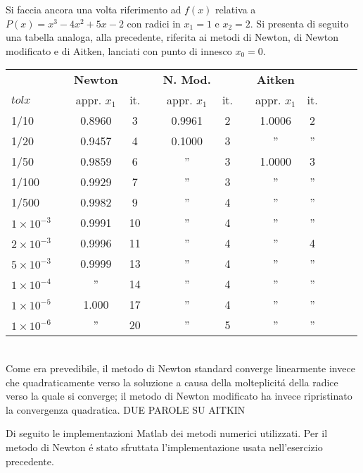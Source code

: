 Si faccia ancora una volta riferimento ad \(f(x)\) relativa a \(P(x)=x^3 - 4x^2 + 5x - 2\) con radici in \(x_1=1\) e \(x_2=2\). Si presenta di seguito una tabella analoga, alla precedente, riferita ai metodi di Newton, di Newton modificato e di Aitken, lanciati con punto di innesco \(x_0 = 0\).\\

\begin{tabular}{l*{12}{c}}
 & \vline& \textbf{Newton} & & \vline& \textbf{N. Mod.} & & \vline& \textbf{Aitken} \\
 \(tolx\) & \vline& appr. \(x_1\) & it. & \vline& appr. \(x_1\) & it.& \vline& appr. \(x_1\) & it.\\
\hline
 1/10 & \vline& 0.8960 & 3						& \vline& 0.9961 & 2 & \vline& 1.0006 & 2 \\
 1/20 & \vline& 0.9457 & 4						& \vline& 0.1000 & 3 & \vline& ''     & ''\\
 1/50 & \vline& 0.9859 & 6						& \vline& ''     & 3 & \vline& 1.0000 & 3 \\
 1/100 & \vline& 0.9929& 7						& \vline& ''     & 3 & \vline& ''     & ''\\
 1/500 & \vline& 0.9982& 9						& \vline& ''     & 4 & \vline& ''     & ''\\
 \(1 \times 10^{-3}\) & \vline& 0.9991 & 10		& \vline& ''     & 4 & \vline& ''     & ''\\
 \(2 \times 10^{-3}\) & \vline& 0.9996 & 11		& \vline& ''     & 4 & \vline& ''     & 4\\
 \(5 \times 10^{-3}\) & \vline& 0.9999 & 13		& \vline& ''     & 4 & \vline& ''     & ''\\
 \(1 \times 10^{-4}\) & \vline& '' & 14			& \vline& ''     & 4 & \vline& ''     & ''\\
 \(1 \times 10^{-5}\) & \vline& 1.000 & 17		& \vline& ''     & 4 & \vline& ''     & ''\\
 \(1 \times 10^{-6}\) & \vline& '' & 20 		& \vline& ''     & 5 & \vline& ''     & ''\\
\end{tabular} \\

\noindent Come era prevedibile, il metodo di Newton standard converge linearmente invece che quadraticamente verso la soluzione a causa della molteplicit\'a della radice verso la quale si converge; il metodo di Newton modificato ha invece ripristinato la convergenza quadratica. DUE PAROLE SU AITKIN

\noindent Di seguito le implementazioni Matlab dei metodi numerici utilizzati. Per il metodo di Newton \'e stato sfruttata l'implementazione usata nell'esercizio precedente.


